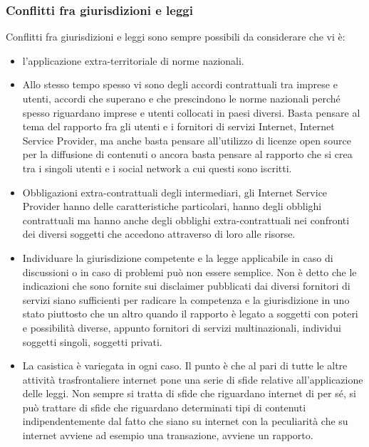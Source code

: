 \subsubsection{Conflitti fra giurisdizioni e leggi}
Conflitti fra giurisdizioni e leggi sono sempre possibili da considerare che vi è:
\begin{itemize}
    \item l'applicazione extra-territoriale di norme nazionali.
    \item Allo stesso tempo spesso vi sono degli accordi contrattuali tra imprese e utenti, accordi che superano e che prescindono le norme nazionali perché spesso riguardano imprese e utenti collocati in paesi diversi. Basta pensare al tema del rapporto fra gli utenti e i fornitori di servizi Internet, Internet Service Provider, ma anche basta pensare all'utilizzo di licenze open source per la diffusione di contenuti o ancora basta pensare al rapporto che si crea tra i singoli utenti e i social network a cui questi sono iscritti.
    \item Obbligazioni extra-contrattuali degli intermediari, gli Internet Service Provider hanno delle caratteristiche particolari, hanno degli obblighi contrattuali ma hanno anche degli obblighi extra-contrattuali nei confronti dei diversi soggetti che accedono attraverso di loro alle risorse.
    \item Individuare la giurisdizione competente e la legge applicabile in caso di discussioni o in caso di problemi può non essere semplice. Non è detto che le indicazioni che sono fornite sui disclaimer pubblicati dai diversi fornitori di servizi siano sufficienti per radicare la competenza e la giurisdizione in uno stato piuttosto che un altro quando il rapporto è legato a soggetti con poteri e possibilità diverse, appunto fornitori di servizi multinazionali, individui soggetti singoli, soggetti privati.
    \item La casistica è variegata in ogni caso. Il punto è che al pari di tutte le altre attività trasfrontaliere internet pone una serie di sfide relative all'applicazione delle leggi. Non sempre si tratta di sfide che riguardano internet di per sé, si può trattare di sfide che riguardano determinati tipi di contenuti indipendentemente dal fatto che siano su internet con la peculiarità che su internet avviene ad esempio una transazione, avviene un rapporto.\par
\end{itemize}
